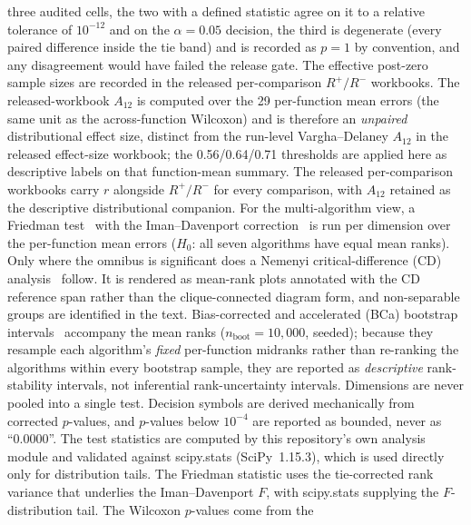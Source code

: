 three audited cells, the two with a defined statistic agree on it to a
relative tolerance of $10^{-12}$ and on the $\alpha = 0.05$ decision, the
third is degenerate (every paired difference inside the tie band) and is
recorded as $p = 1$ by convention, and any disagreement would have failed
the release gate.
The effective post-zero sample sizes are recorded in the released
per-comparison $R^{+}/R^{-}$ workbooks. The released-workbook $A_{12}$ is
computed over the 29 per-function mean errors (the same unit as the
across-function Wilcoxon) and is therefore an \emph{unpaired}
distributional effect size, distinct from the run-level Vargha--Delaney
$A_{12}$ in the released effect-size workbook; the 0.56/0.64/0.71
thresholds are applied here as descriptive labels on that function-mean
summary. The released per-comparison workbooks carry $r$ alongside
$R^{+}/R^{-}$ for every comparison, with $A_{12}$ retained as the descriptive
distributional companion.
For the multi-algorithm view, a Friedman
test~\cite{friedman1937use} with the Iman--Davenport correction~\cite{demsar2006statistical} is
run per dimension over the per-function mean errors ($H_{0}$: all
seven algorithms have equal mean ranks). Only where the
omnibus is significant does a Nemenyi critical-difference (CD)
analysis~\cite{demsar2006statistical} follow. It is rendered as mean-rank plots
annotated with the CD reference span rather than the clique-connected
diagram form, and non-separable groups are identified in the text. Bias-corrected
and accelerated (BCa) bootstrap intervals~\cite{efron1993introduction}
accompany the mean ranks ($n_{\mathrm{boot}} = 10{,}000$, seeded); because
they resample each algorithm's \emph{fixed} per-function midranks rather than
re-ranking the algorithms within every bootstrap sample, they are reported as
\emph{descriptive} rank-stability intervals, not inferential rank-uncertainty
intervals.
Dimensions are never pooled into a single test. Decision symbols are
derived mechanically from corrected $p$-values, and $p$-values below
$10^{-4}$ are reported as bounded, never as ``0.0000''. The test statistics are computed by this repository's own analysis module and
validated against scipy.stats (SciPy~1.15.3), which is used directly
only for distribution tails. The Friedman statistic uses the tie-corrected
rank variance that underlies the Iman--Davenport $F$, with scipy.stats
supplying the $F$-distribution tail. The Wilcoxon $p$-values come from the
